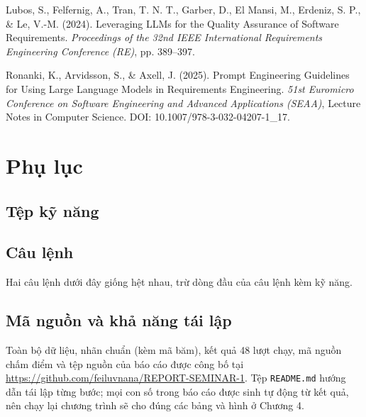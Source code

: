 \documentclass[12pt,a4paper]{report}
\begin{document}
\begin{enumerate}[leftmargin=2.2em,label={[\arabic*]}]
  Lubos, S., Felfernig, A., Tran, T. N. T., Garber, D., El Mansi, M., Erdeniz, S. P., \& Le, V.-M. (2024). Leveraging LLMs for the Quality Assurance of Software Requirements. \textit{Proceedings of the 32nd IEEE International Requirements Engineering Conference (RE)}, pp. 389--397.

  Ronanki, K., Arvidsson, S., \& Axell, J. (2025). Prompt Engineering Guidelines for Using Large Language Models in Requirements Engineering. \textit{51st Euromicro Conference on Software Engineering and Advanced Applications (SEAA)}, Lecture Notes in Computer Science. DOI: 10.1007/978-3-032-04207-1\_17.
\end{enumerate}

\appendix
\chapter{Phụ lục}

\section{Tệp kỹ năng}
\label{app:skill}


\section{Câu lệnh}
Hai câu lệnh dưới đây giống hệt nhau, trừ dòng đầu của câu lệnh kèm kỹ năng.



\section{Mã nguồn và khả năng tái lập}
\label{app:repro}
Toàn bộ dữ liệu, nhãn chuẩn (kèm mã băm), kết quả 48 lượt chạy, mã nguồn chấm điểm và tệp nguồn của báo cáo được công bố tại \url{https://github.com/feiluvnana/REPORT-SEMINAR-1}. Tệp \texttt{README.md} hướng dẫn tái lập từng bước; mọi con số trong báo cáo được sinh tự động từ kết quả, nên chạy lại chương trình sẽ cho đúng các bảng và hình ở Chương 4.
\end{document}
